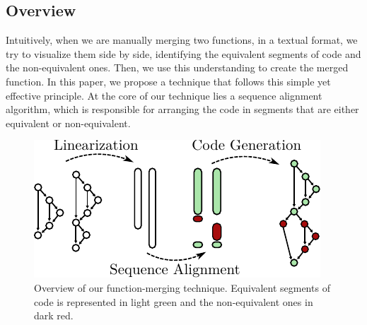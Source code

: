 \subsection{Overview}
Intuitively, when we are manually merging two functions, in a textual format, we try to visualize them side by side, identifying the
equivalent segments of code and the non-equivalent ones. Then, we use this understanding to create the merged function. In this paper, we
propose a technique that follows this simple yet effective principle. At the core of our technique lies a sequence alignment algorithm,
which is responsible for arranging the code in segments that are either equivalent or non-equivalent.

\begin{figure}[t!]
  \centering
  \includegraphics[width=0.85\linewidth]{figs/func-merge-overview.pdf}
  \caption{Overview of our function-merging technique.
           Equivalent segments of code is represented in light green and the non-equivalent ones in dark red.}

  \label{fig:func-merge-overview}
\end{figure}

